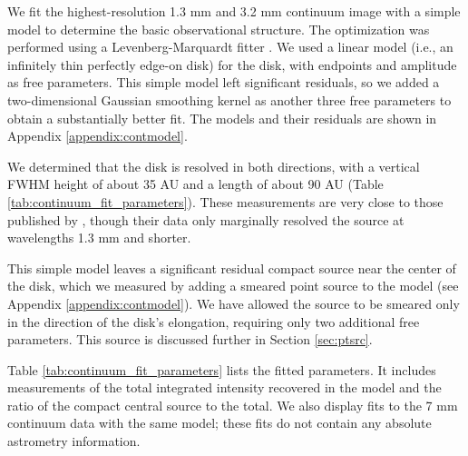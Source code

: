 \documentclass[twocolumn]{aastex61}
\newcommand{\sourcei}{SrcI\xspace}
\begin{document}

We fit the highest-resolution 1.3 mm and 3.2 mm continuum image with a simple
model to determine the basic
observational structure.
The optimization was performed using a Levenberg-Marquardt
fitter \citep{Newville2014a}. 
We used a linear model (i.e., an infinitely thin
perfectly edge-on disk) for the disk, with endpoints and amplitude as free parameters.
This simple model left significant residuals, so we added a two-dimensional
Gaussian smoothing kernel as another three free parameters to obtain a
substantially better fit.
The models and their residuals
are shown in Appendix \ref{appendix:contmodel}.

We determined that the disk is resolved in both
directions, with a vertical FWHM height of about 35 AU and a length of about
90 AU (Table \ref{tab:continuum_fit_parameters}).  These measurements
are very close to those published by \citet{Plambeck2016a}, though their data
only marginally resolved the source at wavelengths 1.3 mm and shorter.

This simple model leaves a significant residual compact source near the center
of the disk, which we measured by adding a smeared point source to the model
(see Appendix \ref{appendix:contmodel}).  We have allowed the source to be
smeared only in the direction of the disk's elongation, requiring only two
additional free parameters.  This source is discussed further in Section
\ref{sec:ptsrc}.

Table \ref{tab:continuum_fit_parameters} lists the fitted parameters.  It 
includes measurements of the total integrated intensity recovered in the model
and the ratio of the compact central source to the total.  We also display
fits to the \citet{Reid2007a} 7 mm continuum data with the same model;
these fits do not contain any absolute astrometry information.
\end{document}
